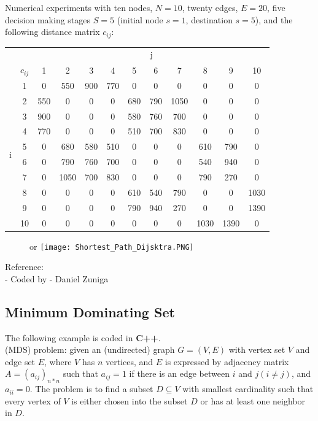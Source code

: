 \documentclass[10pt,bezier]{article}
\begin{document}
\newpage
Numerical experiments with ten nodes, $N = 10$, twenty edges, $E = 20$, five decision making stages $S=5$ (initial node $s=1$, destination $s=5$), and the following distance matrix $c_{ij}$:
\begin{table}[!htbp]
    \centering
    \begin{tabular}{c c | c c c c c c c c c c}\\
	&		&	\multicolumn{10}{c}{j}	\\																		
	&	$c_{ij}$	&	1	&	2	&	3	&	4	&	5	&	6	&	7	&	8	&	9	&	10	\\ \hline
\multirow{10}{*}{i}	&	1	&	0	&	550	&	900	&	770	&	0	&	0	&	0	&	0	&	0	&	0	\\
	&	2	&	550	&	0	&	0	&	0	&	680	&	790	&	1050	&	0	&	0	&	0	\\
	&	3	&	900	&	0	&	0	&	0	&	580	&	760	&	700	&	0	&	0	&	0	\\
	&	4	&	770	&	0	&	0	&	0	&	510	&	700	&	830	&	0	&	0	&	0	\\
	&	5	&	0	&	680	&	580	&	510	&	0	&	0	&	0	&	610	&	790	&	0	\\
	&	6	&	0	&	790	&	760	&	700	&	0	&	0	&	0	&	540	&	940	&	0	\\
	&	7	&	0	&	1050	&	700	&	830	&	0	&	0	&	0	&	790	&	270	&	0	\\
	&	8	&	0	&	0	&	0	&	0	&	610	&	540	&	790	&	0	&	0	&	1030	\\
	&	9	&	0	&	0	&	0	&	0	&	790	&	940	&	270	&	0	&	0	&	1390	\\
	&	10	&	0	&	0	&	0	&	0	&	0	&	0	&	0	&	1030	&	1390	&	0	\\
    \end{tabular}
\end{table}

\begin{figure}[!htbp]or
    \centering
    \texttt{[image: Shortest\_Path\_Dijsktra.PNG]}
\end{figure}

\noindent Reference:\\
- Coded by - Daniel Zuniga

\newpage
\subsection{Minimum Dominating Set}\label{Section7.6}
The following example is coded in {\color{blue}\textbf{C++}}.\\

 (MDS) problem: given an (undirected) graph $G = (V,E)$ with vertex set $V$ and edge set $E$, where $V$ has $n$ vertices, and $E$ is expressed by adjacency matrix $A = (a_{ij})_{n*n}$ such that $a_{ij}=1$ if there is an edge between $i$ and $j (i \neq j)$, and $a_{ii} = 0$. The problem is to find a subset $D \subseteq V$ with smallest cardinality such that every vertex of $V$ is either chosen into the subset $D$ or has at least one neighbor in $D$.\\
\end{document}

